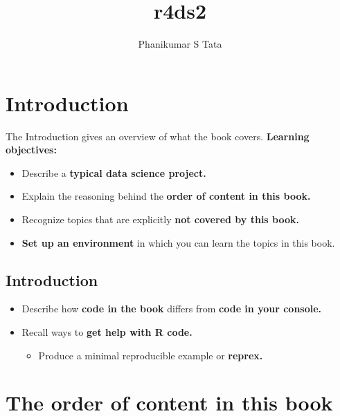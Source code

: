 \documentclass[
  letterpaper,
  DIV=11,
  numbers=noendperiod]{scrartcl}
\title{r4ds2}
\author{Phanikumar S Tata}
\date{}
\providecommand{\tightlist}{%
  \setlength{\itemsep}{0pt}\setlength{\parskip}{0pt}}\usepackage{longtable,booktabs,array}
\begin{document}
\maketitle
\ifdefined\Shaded\renewenvironment{Shaded}{\begin{tcolorbox}[boxrule=0pt, frame hidden, sharp corners, interior hidden, borderline west={3pt}{0pt}{shadecolor}, breakable, enhanced]}{\end{tcolorbox}}\fi

\hypertarget{introduction}{%
\section{Introduction}\label{introduction}}

The Introduction gives an overview of what the book covers.
\textbf{Learning objectives:}

\begin{itemize}
\tightlist
\item
  Describe a \textbf{typical data science project.}
\item
  Explain the reasoning behind the \textbf{order of content in this
  book.}
\item
  Recognize topics that are explicitly \textbf{not covered by this
  book.}
\item
  \textbf{Set up an environment} in which you can learn the topics in
  this book.
\end{itemize}

\hypertarget{introduction-1}{%
\subsection{Introduction}\label{introduction-1}}

\begin{itemize}
\tightlist
\item
  Describe how \textbf{code in the book} differs from \textbf{code in
  your console.}
\item
  Recall ways to \textbf{get help with R code.}

  \begin{itemize}
  \tightlist
  \item
    Produce a minimal reproducible example or \textbf{reprex.}
  \end{itemize}
\end{itemize}

\hypertarget{the-order-of-content-in-this-book}{%
\section{The order of content in this
book}\label{the-order-of-content-in-this-book}}
\end{document}
